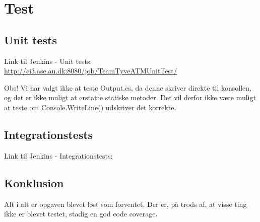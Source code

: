 \chapter{Test}
\section{Unit tests}
Link til Jenkins - Unit tests: \url{http://ci3.ase.au.dk:8080/job/TeamTyveATMUnitTest/} \newline \newline

Obs! Vi har valgt ikke at teste Output.cs, da denne skriver direkte til konsollen, og det er ikke muligt at erstatte statiske metoder. Det vil derfor ikke være muligt at teste om Console.WriteLine() udskriver det korrekte. 

\section{Integrationstests}
Link til Jenkins - Integrationstests: \newline \newline

\section{Konklusion}
Alt i alt er opgaven blevet løst som forventet. Der er, på trods af, at visse ting ikke er blevet testet, stadig en god code coverage.